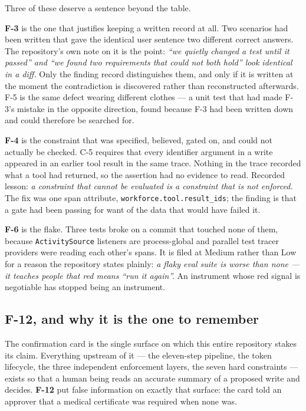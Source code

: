 \documentclass[11pt,a4paper]{article}
\newcommand{\finding}[1]{{\color{primaryblue}\textbf{#1}}}
\begin{document}
Three of these deserve a sentence beyond the table.

\finding{F-3} is the one that justifies keeping a written record at all. Two
scenarios had been written that gave the identical user sentence two different
correct answers. The repository's own note on it is the point: \emph{``we quietly
changed a test until it passed'' and ``we found two requirements that could not
both hold'' look identical in a diff.} Only the finding record distinguishes
them, and only if it is written at the moment the contradiction is discovered
rather than reconstructed afterwards. F-5 is the same defect wearing different
clothes --- a unit test that had made F-3's mistake in the opposite direction,
found because F-3 had been written down and could therefore be searched for.

\finding{F-4} is the constraint that was specified, believed, gated on, and
could not actually be checked. C-5 requires that every identifier argument in a
write appeared in an earlier tool result in the same trace. Nothing in the trace
recorded what a tool had returned, so the assertion had no evidence to read.
Recorded lesson: \emph{a constraint that cannot be evaluated is a constraint
that is not enforced.} The fix was one span attribute,
\texttt{workforce.tool.result\_ids}; the finding is that a gate had been passing
for want of the data that would have failed it.

\finding{F-6} is the flake. Three tests broke on a commit that touched none of
them, because \texttt{ActivitySource} listeners are process-global and parallel
test tracer providers were reading each other's spans. It is filed at Medium
rather than Low for a reason the repository states plainly: \emph{a flaky eval
suite is worse than none --- it teaches people that red means ``run it
again''.} An instrument whose red signal is negotiable has stopped being an
instrument.

\subsection{F-12, and why it is the one to remember}

The confirmation card is the single surface on which this entire repository
stakes its claim. Everything upstream of it --- the eleven-step pipeline, the
token lifecycle, the three independent enforcement layers, the seven hard
constraints --- exists so that a human being reads an accurate summary of a
proposed write and decides. \finding{F-12} put false information on exactly that
surface: the card told an approver that a medical certificate was required when
none was.
\end{document}
